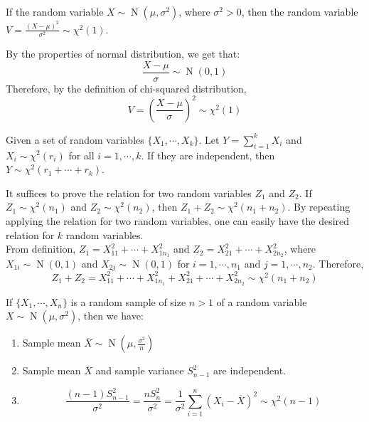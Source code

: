 \documentclass{huhtakm-template-book-v2}
\DeclareMathOperator{\N}{N}
\begin{document}
\begin{thm}
	\label{Chapter 1 (Theorem) chi-square distribution with 1 degree of freedom}
	If the random variable $X\sim\N(\mu,\sigma^{2})$, where $\sigma^{2}>0$, then the random variable $V=\frac{(X-\mu)^{2}}{\sigma^{2}}\sim\chi^{2}(1)$.
\end{thm}
\begin{proofing}
	By the properties of normal distribution, we get that:
	\begin{equation*}
		\frac{X-\mu}{\sigma}\sim\N(0,1)
	\end{equation*}
	Therefore, by the definition of chi-squared distribution,
	\begin{equation*}
		V=\left(\frac{X-\mu}{\sigma}\right)^{2}\sim\chi^{2}(1)
	\end{equation*}
\end{proofing}
\begin{thm}
	Given a set of random variables $\{X_{1},\cdots,X_{k}\}$. Let $Y=\sum_{i=1}^{k}X_{i}$ and $X_{i}\sim\chi^{2}(r_{i})$ for all $i=1,\cdots,k$. If they are independent, then $Y\sim\chi^{2}(r_{1}+\cdots+r_{k})$.
\end{thm}
\begin{proofing}
	It suffices to prove the relation for two random variables $Z_{1}$ and $Z_{2}$. If $Z_{1}\sim\chi^{2}(n_{1})$ and $Z_{2}\sim\chi^{2}(n_{2})$, then $Z_{1}+Z_{2}\sim\chi^{2}(n_{1}+n_{2})$. By repeating applying the relation for two random variables, one can easily have the desired relation for $k$ random variables.\\
	From definition, $Z_{1}=X_{11}^{2}+\cdots+X_{1n_{1}}^{2}$ and $Z_{2}=X_{21}^{2}+\cdots+X_{2n_{2}}^{2}$, where $X_{1i}\sim\N(0,1)$ and $X_{2j}\sim\N(0,1)$ for $i=1,\cdots,n_{1}$ and $j=1,\cdots,n_{2}$. Therefore,
	\begin{equation*}
		Z_{1}+Z_{2}=X_{11}^{2}+\cdots+X_{1n_{1}}^{2}+X_{21}^{2}+\cdots+X_{2n_{2}}^{2}\sim\chi^{2}(n_{1}+n_{2})
	\end{equation*}
\end{proofing}
\begin{thm}
	\label{Chapter 1 (Theorem) Normal and chi-squared distribution related to sample mean and variance}
	If $\{X_{1},\cdots,X_{n}\}$ is a random sample of size $n>1$ of a random variable $X\sim\N(\mu,\sigma^{2})$, then we have:
	\begin{enumerate}
		\item Sample mean $\overline{X}\sim\N(\mu,\frac{\sigma^{2}}{n})$
		\item Sample mean $\overline{X}$ and sample variance $S_{n-1}^{2}$ are independent.
		\item 
		\begin{equation*}
			\frac{(n-1)S_{n-1}^{2}}{\sigma^{2}}=\frac{nS_{n}^{2}}{\sigma^{2}}=\frac{1}{\sigma^{2}}\sum_{i=1}^{n}(X_{i}-\overline{X})^{2}\sim\chi^{2}(n-1)
		\end{equation*}
	\end{enumerate}
\end{thm}
\end{document}
